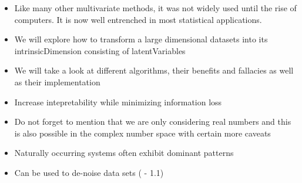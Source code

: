 \begin{itemize}
	\item Like many other multivariate methods, it was not widely used until the rise of computers. 
	It is now well entrenched in most statistical applications. \cite{Jolliffe2002book}
	\item We will explore how to transform a large dimensional datasets into its \gls{intrinsicDimension} consisting of \glspl{latentVariable}
	\item We will take a look at different algorithms, their benefits and fallacies as well as their implementation
	\item Increase intepretability while minimizing information loss \cite{jolliffe2016principal}
	\item Do not forget to mention that we are only considering real numbers and this is also possible in the complex number space with certain more caveats
	\item Naturally occurring systems often exhibit dominant patterns
	\item Can be used to de-noise data sets (\cite{brunton2019data} - 1.1)
\end{itemize}
